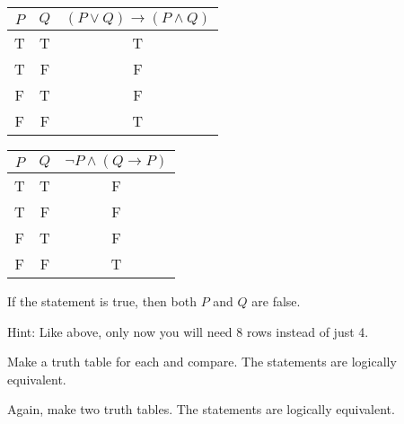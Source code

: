 \documentclass[11pt]{exam}
\def\imp{\rightarrow}
\def\and{\wedge}
\begin{document}
\begin{questions}
\question \begin{tabular}{c|c|c}
             $P$ & $Q$ & $(P \vee Q) \imp (P \and Q)$\\ \hline
             T & T & T \\
             T & F & F \\
             F & T & F \\
             F & F & T
          \end{tabular}
 

\question \begin{tabular}{c|c|c}
             $P$ & $Q$ & $\neg P \and (Q \imp P)$\\ \hline
             T & T & F \\
             T & F & F \\
             F & T & F \\
             F & F & T
          \end{tabular}
If the statement is true, then both $P$ and $Q$ are false.

\question Hint: Like above, only now you will need 8 rows instead of just 4.

\question Make a truth table for each and compare.  The statements are logically equivalent.

\question Again, make two truth tables.  The statements are logically equivalent.

\question 
{}


\end{questions}
\end{document}
